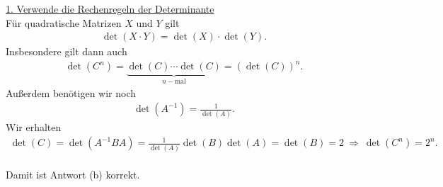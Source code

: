 \underline{1. Verwende die Rechenregeln der Determinante}\\
Für quadratische Matrizen $ X $ und $ Y $ gilt
\begin{align*}
\det (X\cdot Y) = \det(X) \cdot \det(Y).
\end{align*}
Insbesondere gilt dann auch
\begin{align*}
\det(C^n) = \underbrace{\det(C) \cdots \det(C)}_{
	 n -\textrm{mal}
}
=\left(\det(C)\right)^n.
\end{align*}
Außerdem benötigen wir noch
\begin{align*}
\det (A^{-1}) = \frac{1}{\det(A)}.
\end{align*}
Wir erhalten
\begin{align*}
\det(C) = \det(A^{-1} B A)
=
\frac{1}{\det(A)} \det(B) \det(A)
=
\det(B) = 2
\
\Rightarrow 
\
\det(C^n) = 2^n.
\end{align*}
\ \\
Damit ist Antwort (b) korrekt.
\newpage

